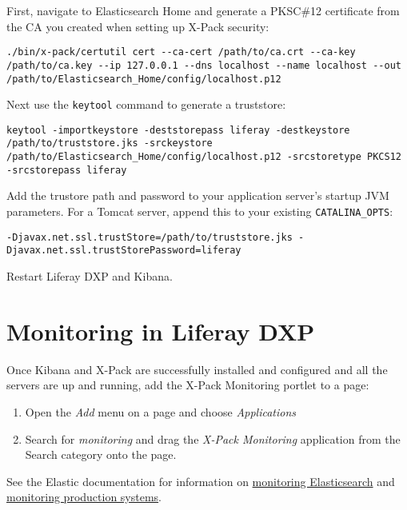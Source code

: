 \begin{enumerate}
  First, navigate to Elasticsearch Home and generate a PKSC\#12
  certificate from the CA you created when setting up X-Pack security:

\begin{verbatim}
./bin/x-pack/certutil cert --ca-cert /path/to/ca.crt --ca-key /path/to/ca.key --ip 127.0.0.1 --dns localhost --name localhost --out /path/to/Elasticsearch_Home/config/localhost.p12
\end{verbatim}

  Next use the \texttt{keytool} command to generate a truststore:

\begin{verbatim}
keytool -importkeystore -deststorepass liferay -destkeystore /path/to/truststore.jks -srckeystore /path/to/Elasticsearch_Home/config/localhost.p12 -srcstoretype PKCS12 -srcstorepass liferay
\end{verbatim}

  Add the trustore path and password to your application server's
  startup JVM parameters. For a Tomcat server, append this to your
  existing \texttt{CATALINA\_OPTS}:

\begin{verbatim}
-Djavax.net.ssl.trustStore=/path/to/truststore.jks -Djavax.net.ssl.trustStorePassword=liferay
\end{verbatim}
\end{enumerate}

Restart Liferay DXP and Kibana.

\section{Monitoring in Liferay
DXP}\label{monitoring-in-liferay-dxp-1}

Once Kibana and X-Pack are successfully installed and configured and all
the servers are up and running, add the X-Pack Monitoring portlet to a
page:

\begin{enumerate}
\def\labelenumi{\arabic{enumi}.}
\item
  Open the \emph{Add} menu on a page and choose \emph{Applications}
\item
  Search for \emph{monitoring} and drag the \emph{X-Pack Monitoring}
  application from the Search category onto the page.
\end{enumerate}

See the Elastic documentation for information on
\href{https://www.elastic.co/guide/en/elasticsearch/reference/6.1/es-monitoring.html}{monitoring
Elasticsearch} and
\href{https://www.elastic.co/guide/en/x-pack/6.1/monitoring-production.html}{monitoring
production systems}.


